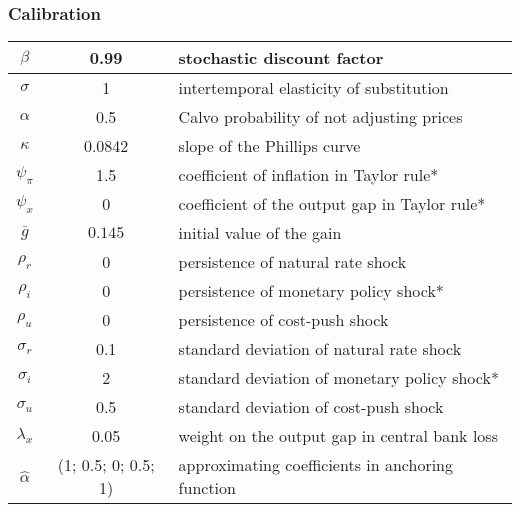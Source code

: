 \documentclass[10pt]{beamer}
\begin{document}
\begin{frame}
	\frametitle{Calibration}

\begin{center}
\begin{table}
\begin{tabular}{ c | c  | l }
 $\beta$ & 0.99 & stochastic discount factor \\  \hline
 $\sigma$ & 1  & intertemporal elasticity of substitution \\  \hline
 $\alpha$ & 0.5 &  Calvo probability of not adjusting prices \\\hline
 $\kappa$ & 0.0842 &  slope of the Phillips curve \\\hline
 $\psi_{\pi} $& 1.5  & coefficient of inflation in Taylor rule*\\\hline
 $\psi_x$ & 0   & coefficient of the output gap in Taylor rule*  \\\hline %
 $\bar{g}$ & $0.145$  & initial value of the gain \\\hline %
    $\rho_r$ & 0 &   persistence of natural rate shock \\ \hline %
    $\rho_i$ & 0 &  persistence of monetary policy shock*  \\ \hline
    $\rho_u$ & 0  &  persistence of cost-push shock  \\ \hline
    $\sigma_r$ & 0.1 & standard deviation of natural rate shock  \\ \hline
    $\sigma_i$ &  2  &standard deviation of monetary policy shock*  \\ \hline %
    $\sigma_u$ & 0.5 & standard deviation of cost-push shock   \\ \hline  
    $\lambda_x$ & 0.05 & weight on the output gap in central bank loss   \\ \hline  %
    $\hat{\alpha}$ & (1; 0.5; 0; 0.5; 1) & approximating coefficients in anchoring function \\ \hline   
\end{tabular}     
       \label{calibration}
 \end{table}
\end{center}
\end{frame}
\end{document}
